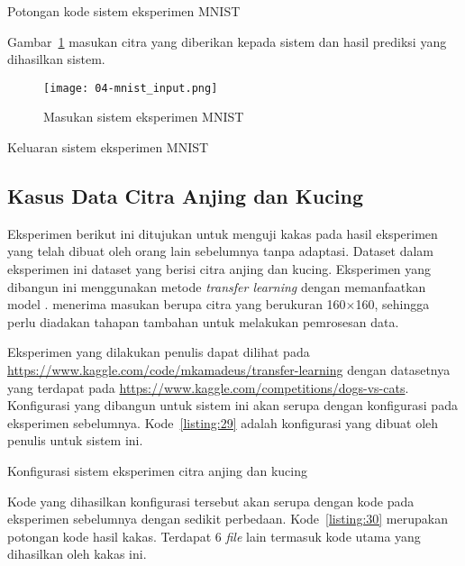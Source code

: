 \begin{code}
	\caption{Potongan kode sistem eksperimen MNIST}\label{listing:27}
\end{code}

Gambar~\ref{fig:04-mnist-input} masukan citra yang diberikan kepada sistem dan hasil prediksi yang dihasilkan sistem.

\begin{figure}[H]
    \centering
    \texttt{[image: 04-mnist\_input.png]}
    \caption{Masukan sistem eksperimen MNIST}\label{fig:04-mnist-input}
\end{figure}

\begin{code}
	\caption{Keluaran sistem eksperimen MNIST}\label{listing:28}
\end{code}

\subsection{Kasus Data Citra Anjing dan Kucing}

Eksperimen berikut ini ditujukan untuk menguji kakas pada hasil eksperimen yang telah dibuat oleh orang lain sebelumnya tanpa adaptasi.
Dataset dalam eksperimen ini dataset yang berisi citra anjing dan kucing.
Eksperimen yang dibangun ini menggunakan metode \textit{transfer learning} dengan memanfaatkan model .
 menerima masukan berupa citra yang berukuran 160\(\times\)160, sehingga perlu diadakan tahapan tambahan untuk melakukan pemrosesan data.

Eksperimen yang dilakukan penulis dapat dilihat pada \url{https://www.kaggle.com/code/mkamadeus/transfer-learning} dengan datasetnya yang terdapat pada \url{https://www.kaggle.com/competitions/dogs-vs-cats}.
Konfigurasi yang dibangun untuk sistem ini akan serupa dengan konfigurasi pada eksperimen sebelumnya.
Kode~\ref{listing:29} adalah konfigurasi yang dibuat oleh penulis untuk sistem ini.

\begin{code}
	\caption{Konfigurasi sistem eksperimen citra anjing dan kucing}\label{listing:29}
\end{code}

Kode yang dihasilkan konfigurasi tersebut akan serupa dengan kode pada eksperimen sebelumnya dengan sedikit perbedaan.
Kode~\ref{listing:30} merupakan potongan kode hasil kakas.
Terdapat 6 \textit{file} lain termasuk kode utama yang dihasilkan oleh kakas ini.


